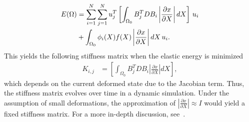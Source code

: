 \documentclass[journal]{IEEEtran}
\newcommand{\di}[2]{\frac{\partial#1}{\partial#2}}
\begin{document}
\begin{align}
  E(\Omega) & = \sum_{i=1}^N\sum_{j=1}^N u_j^T \left[\int_{\Omega_0} B_j^TDB_i \left|\di{x}{X}\right| dX\right]\, u_i \notag\\
  & + \int_{\Omega_0} \phi_i(X)f(X) \left|\di{x}{X}\right|dX\,u_i.
  \label{eq:strainenergy}
\end{align}
This yields the following stiffness matrix when the elastic energy is minimized
\begin{align}
 K_{i,j} & = \left[\int_{\Omega_0} B_j^TDB_i \left|\di{x}{X}\right| dX\right], \label{eq:stiffness}
\end{align}
which depends on the current deformed state due to the Jacobian term. Thus, the stiffness matrix evolves over time in a dynamic simulation. Under the assumption of small deformations, the approximation of $\left|\di{x}{X}\right|\approx I$ would yield a fixed stiffness matrix. For a more in-depth discussion, see~\cite{Bonet00a}.
\ifCLASSOPTIONcaptionsoff
  \newpage
\fi



\end{document}
